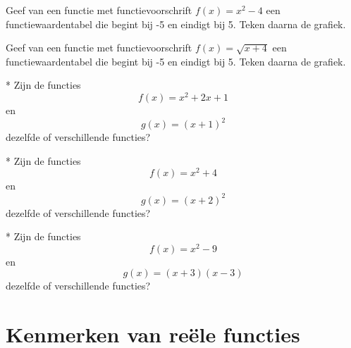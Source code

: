 \documentclass[12pt,twoside]{article}
\begin{document}
\begin{oefening}
  Geef van een functie met functievoorschrift $f(x)=x^2-4$ een functiewaardentabel die begint bij -5 en eindigt bij 5. Teken daarna de grafiek.
\end{oefening}

\begin{oefening}
  Geef van een functie met functievoorschrift $f(x)=\sqrt{x+4}$ een functiewaardentabel die begint bij -5 en eindigt bij 5. Teken daarna de grafiek.
\end{oefening}

\begin{oefening}*
  Zijn de functies
  $$f(x)=x^2+2x+1$$
  en
  $$g(x)=(x+1)^2$$
  dezelfde of verschillende functies?
\end{oefening}

\begin{oefening}*
  Zijn de functies
  $$f(x)=x^2+4$$
  en
  $$g(x)=(x+2)^2$$
  dezelfde of verschillende functies?
\end{oefening}

\begin{oefening}*
  Zijn de functies
  $$f(x)=x^2-9$$
  en
  $$g(x)=(x+3)(x-3)$$
  dezelfde of verschillende functies?
\end{oefening}


\pagebreak
\section{Kenmerken van reële functies}
\end{document}

